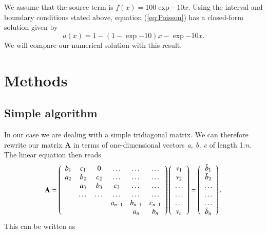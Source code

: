 \documentclass{article}
\begin{document}
\begin{multicols}{2}
We assume that the source term is $f(x) = 100\exp{-10x}$. Using the interval and boundary conditions stated above, equation (\ref{eq:Poisson}) has a closed-form solution given by
\begin{equation}
u(x) = 1-(1-\exp{-10})x-\exp{-10x}.
\end{equation}
We will compare our numerical solution with this result. 





\section{Methods}
\subsection{Simple algorithm}
In our case we are dealing with a simple tridiagonal matrix. We can therefore rewrite our matrix \textbf{A} in terms of one-dimensional vectors \textit{a, b, c} of length 1:\textit{n}. The linear equation then reads
\begin{equation}
    {\bf A} = \left(\begin{array}{cccccc}
                           b_1& c_1 & 0 &\dots   & \dots &\dots \\
                           a_2 & b_2 & c_2 &\dots &\dots &\dots \\
                           & a_3 & b_3 & c_3 & \dots & \dots \\
                           & \dots   & \dots &\dots   &\dots & \dots \\
                           &   &  &a_{n-1}  &b_{n-1}& c_{n-1} \\
                           &    &  &   &a_n & b_n \\
                      \end{array} \right)\left(\begin{array}{c}
                           v_1\\
                           v_2\\
                           \dots \\
                          \dots  \\
                          \dots \\
                           v_n\\
                      \end{array} \right)
  =\left(\begin{array}{c}
                           \tilde{b}_1\\
                           \tilde{b}_2\\
                           \dots \\
                           \dots \\
                          \dots \\
                           \tilde{b}_n\\
                      \end{array} \right).
\end{equation}
This can be written as


\end{multicols}
\end{document}
